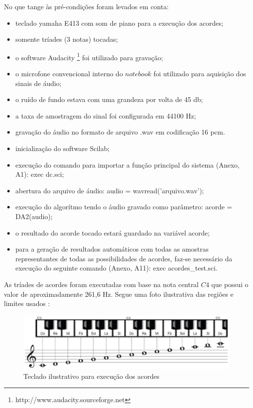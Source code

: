 No que tange às pré-condições foram levados em conta:
\begin{itemize}
    \item teclado yamaha E413 com som de piano para a execução dos acordes;
    \item somente tríades (3 notas) tocadas;
    \item o software Audacity \footnote{http://www.audacity.sourceforge.net} foi utilizado para gravação;
    \item o microfone convencional interno do $notebook$ foi utilizado para aquisição dos sinais de áudio;
    \item o ruído de fundo estava com uma grandeza por volta de 45 db;
    \item a taxa de amostragem do sinal foi configurada em 44100 Hz;
    \item gravação do áudio no formato de arquivo .wav em codificação 16 pcm.
    \item inicialização do software Scilab;
    \item execução do comando para importar a função principal do sistema (Anexo, A1): exec dc.sci;
    \item abertura do arquivo de áudio: audio = wavread('arquivo.wav');
    \item execução do algorítmo tendo o áudio gravado como parâmetro: acorde = DA2(audio);
    \item o resultado do acorde tocado estará guardado na variável acorde;
    \item para a geração de resultados automáticos com todas as amostras representantes de todas as possibilidades de acordes, faz-se necessário da execução do seguinte comando (Anexo, A11): exec acordes{\_}test.sci.
\end{itemize}

\newpage
As tríades de acordes foram executadas com base na nota central $C4$ que possui o valor de aproximadamente 261,6 Hz. Segue uma foto ilustrativa das regiões e limites usados \cite{teclado}:

\begin{figure}[h]
	\centering
		\includegraphics[keepaspectratio=true,scale=0.4]{figuras/teclado-tcc1.eps}
	\caption{Teclado ilustrativo para execução dos acordes}
\end{figure}

